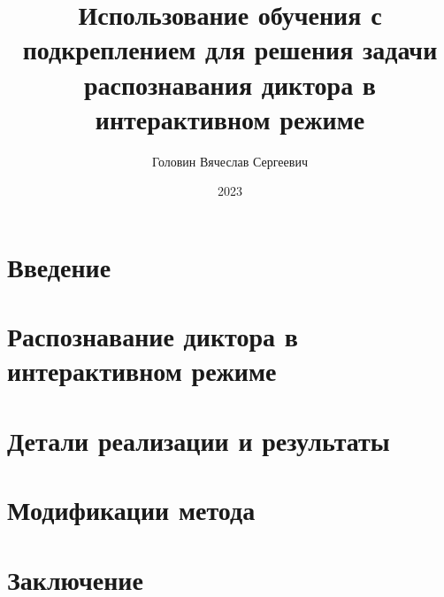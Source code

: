 \documentclass[a4paper,12pt]{article}
\author{Головин Вячеслав Сергеевич}
\title{Использование обучения с подкреплением для решения задачи распознавания
диктора в интерактивном режиме}
\date{2023}
\begin{document}
\maketitle

\tableofcontents

\section*{Введение}\label{sec:intro}



\section{Распознавание диктора в интерактивном режиме}



\section{Детали реализации и результаты}



\section{Модификации метода}



\section*{Заключение}



\printbibliography[title=Список литературы]
\end{document}

